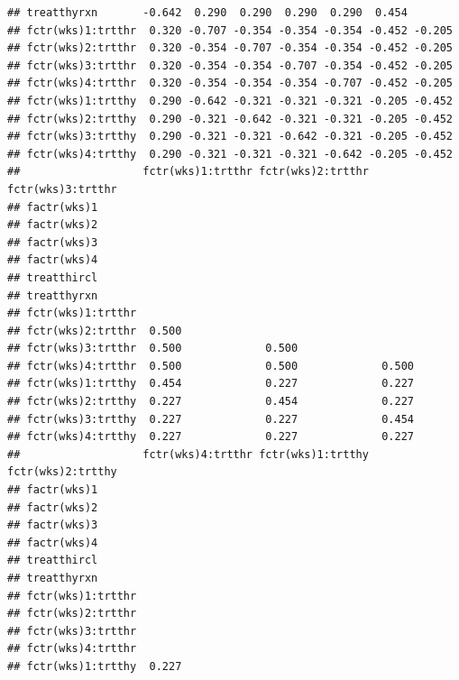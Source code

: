 \documentclass{article}\usepackage[]{graphicx}\usepackage[]{color}
\makeatletter
\newenvironment{kframe}{%
 \def\at@end@of@kframe{}%
 \ifinner\ifhmode%
  \def\at@end@of@kframe{\end{minipage}}%
  \begin{minipage}{\columnwidth}%
 \fi\fi%
 \def\FrameCommand##1{\hskip\@totalleftmargin \hskip-\fboxsep
 \colorbox{shadecolor}{##1}\hskip-\fboxsep
     \hskip-\linewidth \hskip-\@totalleftmargin \hskip\columnwidth}%
 \MakeFramed {\advance\hsize-\width
   \@totalleftmargin\z@ \linewidth\hsize
   \@setminipage}}%
 {\par\unskip\endMakeFramed%
 \at@end@of@kframe}
\newenvironment{knitrout}{}{} %
\makeatother
\begin{document}
\begin{enumerate}[(a)]
\begin{knitrout}
\begin{kframe}
\begin{verbatim}
## treatthyrxn       -0.642  0.290  0.290  0.290  0.290  0.454       
## fctr(wks)1:trtthr  0.320 -0.707 -0.354 -0.354 -0.354 -0.452 -0.205
## fctr(wks)2:trtthr  0.320 -0.354 -0.707 -0.354 -0.354 -0.452 -0.205
## fctr(wks)3:trtthr  0.320 -0.354 -0.354 -0.707 -0.354 -0.452 -0.205
## fctr(wks)4:trtthr  0.320 -0.354 -0.354 -0.354 -0.707 -0.452 -0.205
## fctr(wks)1:trtthy  0.290 -0.642 -0.321 -0.321 -0.321 -0.205 -0.452
## fctr(wks)2:trtthy  0.290 -0.321 -0.642 -0.321 -0.321 -0.205 -0.452
## fctr(wks)3:trtthy  0.290 -0.321 -0.321 -0.642 -0.321 -0.205 -0.452
## fctr(wks)4:trtthy  0.290 -0.321 -0.321 -0.321 -0.642 -0.205 -0.452
##                   fctr(wks)1:trtthr fctr(wks)2:trtthr fctr(wks)3:trtthr
## factr(wks)1                                                            
## factr(wks)2                                                            
## factr(wks)3                                                            
## factr(wks)4                                                            
## treatthircl                                                            
## treatthyrxn                                                            
## fctr(wks)1:trtthr                                                      
## fctr(wks)2:trtthr  0.500                                               
## fctr(wks)3:trtthr  0.500             0.500                             
## fctr(wks)4:trtthr  0.500             0.500             0.500           
## fctr(wks)1:trtthy  0.454             0.227             0.227           
## fctr(wks)2:trtthy  0.227             0.454             0.227           
## fctr(wks)3:trtthy  0.227             0.227             0.454           
## fctr(wks)4:trtthy  0.227             0.227             0.227           
##                   fctr(wks)4:trtthr fctr(wks)1:trtthy fctr(wks)2:trtthy
## factr(wks)1                                                            
## factr(wks)2                                                            
## factr(wks)3                                                            
## factr(wks)4                                                            
## treatthircl                                                            
## treatthyrxn                                                            
## fctr(wks)1:trtthr                                                      
## fctr(wks)2:trtthr                                                      
## fctr(wks)3:trtthr                                                      
## fctr(wks)4:trtthr                                                      
## fctr(wks)1:trtthy  0.227                                               

\end{verbatim}
\end{kframe}
\end{knitrout}
\end{enumerate}
\end{document}
